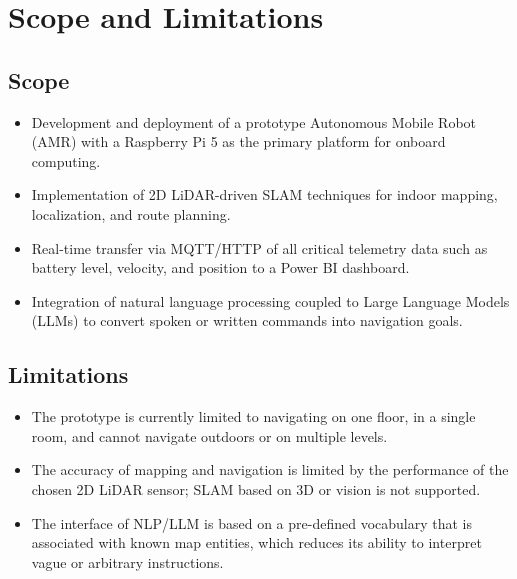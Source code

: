 \section{Scope and Limitations}

\subsection{Scope}
\begin{itemize}
    \item Development and deployment of a prototype Autonomous Mobile Robot (AMR) with a Raspberry Pi 5 as the primary platform for onboard computing.
    \item Implementation of 2D LiDAR-driven SLAM techniques for indoor mapping, localization, and route planning.
    \item Real-time transfer via MQTT/HTTP of all critical telemetry data such as battery level, velocity, and position to a Power BI dashboard.
    \item Integration of natural language processing coupled to Large Language Models (LLMs) to convert spoken or written commands into navigation goals.
\end{itemize}

\subsection{Limitations}
\begin{itemize}
    \item The prototype is currently limited to navigating on one floor, in a single room, and cannot navigate outdoors or on multiple levels.
    \item The accuracy of mapping and navigation is limited by the performance of the chosen 2D LiDAR sensor; SLAM based on 3D or vision is not supported.
    \item The interface of NLP/LLM is based on a pre-defined vocabulary that is associated with known map entities, which reduces its ability to interpret vague or arbitrary instructions.
\end{itemize}